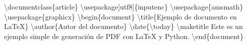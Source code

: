 \documentclass{article}%
\begin{document}
%
\normalsize%
\newline%
\textbackslash{}documentclass\{article\}\newline%
\textbackslash{}usepackage{[}utf8{]}\{inputenc\}\newline%
\textbackslash{}usepackage\{amsmath\}\newline%
\textbackslash{}usepackage\{graphicx\}\newline%
\newline%
\textbackslash{}begin\{document\}\newline%
\newline%
\textbackslash{}title\{Ejemplo de documento en LaTeX\}\newline%
\textbackslash{}author\{Autor del documento\}\newline%
\textbackslash{}date\{\textbackslash{}today\}\newline%
\textbackslash{}maketitle\newline%
\newline%
Este es un ejemplo simple de generación de PDF con LaTeX y Python.\newline%
\newline%
\textbackslash{}end\{document\}\newline%
%
\end{document}
